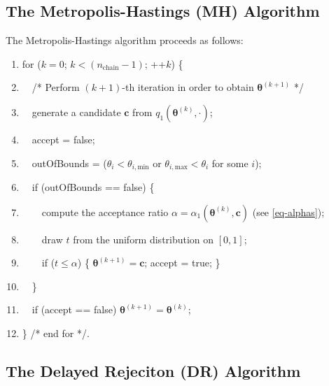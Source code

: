 \subsection{The Metropolis-Hastings (MH) Algorithm}%

The Metropolis-Hastings algorithm proceeds as follows:
\begin{enumerate}
\item for ($k=0$; $k < (n_{\text{chain}}-1)$; ++$k$) \{
\item $\quad$/* Perform $(k+1)$-th iteration in order to obtain $\boldsymbol{\theta}^{(k+1)}$ */
\item $\quad$generate a candidate $\mathbf{c}$ from $q_1(\boldsymbol{\theta}^{(k)},\cdot)$;
\item $\quad$accept = false;
\item $\quad$outOfBounds = ($\theta_i < \theta_{i,\text{min}}$ or $\theta_{i,\text{max}} < \theta_i$ for some $i$);
\item $\quad$if (outOfBounds == false) \{
\item $\quad\quad$compute the acceptance ratio $\alpha=\alpha_1(\boldsymbol{\theta}^{(k)},\mathbf{c})$ (see \eqref{eq-alphas});
\item $\quad\quad$draw $t$ from the uniform distribution on $[0,1]$;
\item $\quad\quad$if ($t\leqslant \alpha$) \{ $\boldsymbol{\theta}^{(k+1)}=\mathbf{c}$; accept = true; \}
\item $\quad$\}
\item $\quad$if (accept == false) $\boldsymbol{\theta}^{(k+1)}=\boldsymbol{\theta}^{(k)}$;
\item \} /* end for */.
\end{enumerate}

\subsection{The Delayed Rejeciton (DR) Algorithm}%

